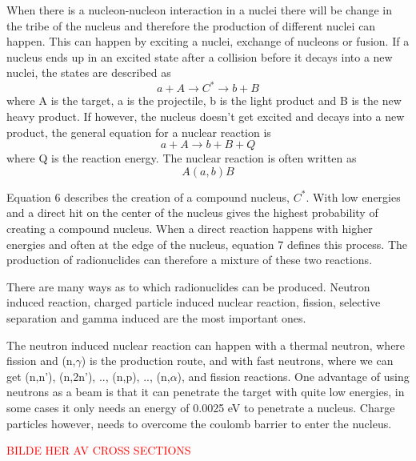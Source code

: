 \documentclass[twoside,english]{uiofysmaster/uiofysmaster}
\begin{document}
When there is a nucleon-nucleon interaction in a nuclei there will be change in the tribe of the nucleus and therefore the production of different nuclei can happen. This can happen by exciting a nuclei, exchange of nucleons or fusion. \cite{nuclearchem}
If a nucleus ends up in an excited state after a collision before it decays into a new nuclei, the states are described as \begin{equation}
    a + A \rightarrow C^* \rightarrow b + B 
\end{equation} \cite{nuclearchem}
where A is the target, a is the projectile, b is the light product and B is the new heavy product. If however, the nucleus doesn't get excited and decays into a new product, the general equation for a nuclear reaction is
\begin{equation}
    a + A \rightarrow b + B + Q 
\end{equation}
where Q is the reaction energy. The nuclear reaction is often written as \begin{equation}
A(a,b)B
\end{equation}


Equation 6 describes the creation of a compound nucleus, $C^*$. With low energies and a direct hit on the center of the nucleus gives the highest probability of creating a compound nucleus. When a direct reaction happens with higher energies and often at the edge of the nucleus, equation 7 defines this process\cite{Nuclear_medicine}. The production of radionuclides can therefore a mixture of these two reactions.


There are many ways as to which radionuclides can be produced. Neutron induced reaction, charged particle induced nuclear reaction, fission, selective separation and gamma induced are the most important ones\cite{Nuclear_medicine}.

The neutron induced nuclear reaction can happen with a thermal neutron, where fission and (n,$\gamma$) is the production route, and with fast neutrons, where we can get (n,n'), (n,2n'), .., (n,p), .., (n,$\alpha$), and fission reactions. One advantage of using neutrons as a beam is that it can penetrate the target with quite low energies, in some cases it only needs an energy of 0.0025 eV to penetrate a nucleus\cite{Nuclear_medicine}. Charge particles however, needs to overcome the coulomb barrier to enter the nucleus. 

\textcolor{red}{BILDE HER AV CROSS SECTIONS}
\end{document}
